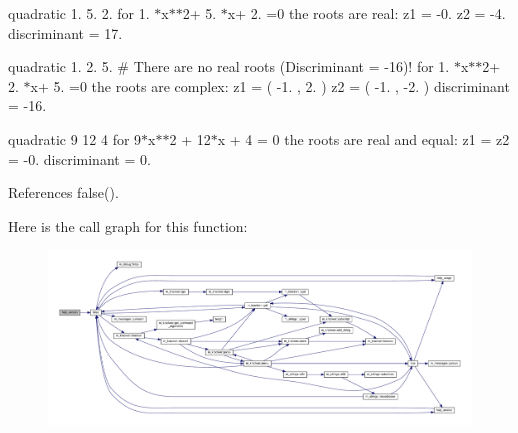 quadratic 1. 5. 2. for 1. $\ast$x$\ast$$\ast$2+ 5. $\ast$x+ 2. =0 the roots are real\+: z1 = -\/0. z2 = -\/4. discriminant = 17.

quadratic 1. 2. 5. \# There are no real roots (Discriminant = -\/16)! for 1. $\ast$x$\ast$$\ast$2+ 2. $\ast$x+ 5. =0 the roots are complex\+: z1 = ( -\/1. , 2. ) z2 = ( -\/1. , -\/2. ) discriminant = -\/16.

quadratic 9 12 4 for 9$\ast$x$\ast$$\ast$2 + 12$\ast$x + 4 = 0 the roots are real and equal\+: z1 = z2 = -\/0. discriminant = 0. 

References false().

Here is the call graph for this function\+:
\nopagebreak
\begin{figure}[H]
\begin{center}
\leavevmode
\includegraphics[width=350pt]{quadratic_8f90_a39c21619b08a3c22f19e2306efd7f766_cgraph}
\end{center}
\end{figure}
